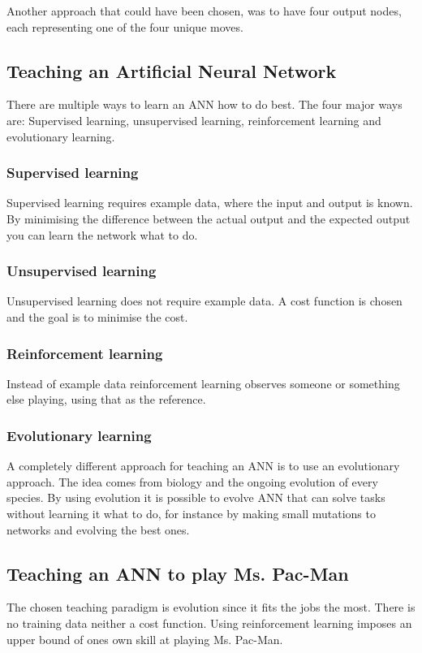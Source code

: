 Another approach that could have been chosen, was to have four output nodes, each representing one of the four unique moves.

\subsection{Teaching an Artificial Neural Network}
There are multiple ways to learn an ANN how to do best. The four major ways are: Supervised learning, unsupervised learning, reinforcement learning and evolutionary learning.

\subsubsection{Supervised learning}
Supervised learning requires example data, where the input and output is known. By minimising the difference between the actual output and the expected output you can learn the network what to do.

\subsubsection{Unsupervised learning}
Unsupervised learning does not require example data. A cost function is chosen and the goal is to minimise the cost.

\subsubsection{Reinforcement learning}
Instead of example data reinforcement learning observes someone or something else playing, using that as the reference.

\subsubsection{Evolutionary learning}
A completely different approach for teaching an ANN is to use an evolutionary approach. The idea comes from biology and the ongoing evolution of every species. By using evolution it is possible to evolve ANN that can solve tasks without learning it what to do, for instance by making small mutations to networks and evolving the best ones.

\subsection{Teaching an ANN to play Ms. Pac-Man}
The chosen teaching paradigm is evolution since it fits the jobs the most. There is no training data neither a cost function. Using reinforcement learning imposes an upper bound of ones own skill at playing Ms. Pac-Man.

